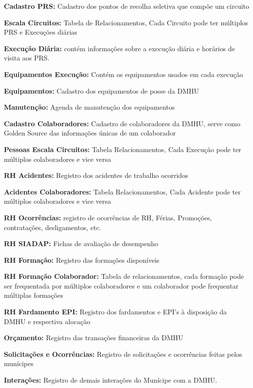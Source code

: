 \documentclass[12pt,a4paper,final]{article}
\begin{document}
    \textbf{Cadastro PRS:} Cadastro dos pontos de recolha seletiva que compõe um circuito

    \textbf{Escala Circuitos:} Tabela de Relacionamentos, Cada Circuito pode ter múltiplos PRS e Execuções diárias

    \textbf{Execução Diária:} contém informações sobre a execução diária e horários de visita aos PRS.

    \textbf{Equipamentos Execução:} Contém os equipamentos usados em cada execução

    \textbf{Equipamentos:} Cadastro dos equipamentos de posse da DMHU

    \textbf{Manutenção:} Agenda de manutenção dos equipamentos

    \textbf{Cadastro Colaboradores:} Cadastro de colaboradores da DMHU, serve como Golden Source das informações únicas de um colaborador

    \textbf{Pessoas Escala Circuitos:} Tabela Relacionamentos, Cada Execução pode ter múltiplos colaboradores e vice versa

    \textbf{RH Acidentes:} Registro dos acidentes de trabalho ocorridos

    \textbf{Acidentes Colaboradores:} Tabela Relacionamentos, Cada Acidente pode ter múltiplos colaboradores e vice versa

    \textbf{RH Ocorrências:} registro de ocorrências de RH, Férias, Promoções, contratações, desligamentos, etc.

    \textbf{RH SIADAP:} Fichas de avaliação de desempenho

    \textbf{RH Formação:} Registro das formações disponíveis

    \textbf{RH Formação Colaborador:} Tabela de relacionamentos, cada formação pode ser frequentada por múltiplos colaboradores e um colaborador pode frequentar múltiplas formações

    \textbf{RH Fardamento EPI:} Registro dos fardamentos e EPI’s à disposição da DMHU e respectiva alocação

    \textbf{Orçamento:} Registro das transações financeiras da DMHU

    \textbf{Solicitações e Ocorrências:} Registro de solicitações e ocorrências feitas pelos munícipes

    \textbf{Interações:} Registro de demais interações do Munícipe com a DMHU.

    \newpage
    \nocite{*}
    \printbibliography
\end{document}
